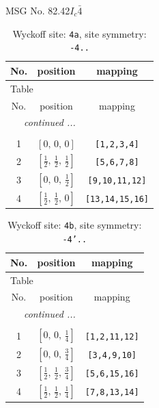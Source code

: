 \documentclass[fleqn,8pt]{jsarticle}
\begin{document}
\setcounter{MaxMatrixCols}{32}

\renewcommand{\tablename}{Table~}
\renewcommand{\figurename}{Figure~}
\begin{center}
\LARGE
MSG No. 82.42\quad$I_{c}\bar{4}$
\end{center}
\renewcommand{\arraystretch}{1.2}
\begin{longtable}{ccc}
\caption{Wyckoff site: {\tt 4a}, site symmetry: {\tt -4..}}
 \\
 \hline \hline
No. & position & mapping \\ \hline \endfirsthead

\multicolumn{2}{l}{\tablename\ \thetable{}} \\
 \hline \hline
No. & position & mapping \\ \hline \endhead

 \hline \hline
\multicolumn{2}{r}{\footnotesize\it continued ...} \\ \endfoot

 \hline \hline
\multicolumn{2}{r}{} \\ \endlastfoot

1 & $\left[ 0,\, 0,\, 0 \right]$ & {\tt [1,2,3,4]} \\ \hline
2 & $\left[ \frac{1}{2},\, \frac{1}{2},\, \frac{1}{2} \right]$ & {\tt [5,6,7,8]} \\ \hline
3 & $\left[ 0,\, 0,\, \frac{1}{2} \right]$ & {\tt [9,10,11,12]} \\ \hline
4 & $\left[ \frac{1}{2},\, \frac{1}{2},\, 0 \right]$ & {\tt [13,14,15,16]} \\
\end{longtable}
\renewcommand{\arraystretch}{1.2}
\begin{longtable}{ccc}
\caption{Wyckoff site: {\tt 4b}, site symmetry: {\tt -4'..}}
 \\
 \hline \hline
No. & position & mapping \\ \hline \endfirsthead

\multicolumn{2}{l}{\tablename\ \thetable{}} \\
 \hline \hline
No. & position & mapping \\ \hline \endhead

 \hline \hline
\multicolumn{2}{r}{\footnotesize\it continued ...} \\ \endfoot

 \hline \hline
\multicolumn{2}{r}{} \\ \endlastfoot

1 & $\left[ 0,\, 0,\, \frac{1}{4} \right]$ & {\tt [1,2,11,12]} \\ \hline
2 & $\left[ 0,\, 0,\, \frac{3}{4} \right]$ & {\tt [3,4,9,10]} \\ \hline
3 & $\left[ \frac{1}{2},\, \frac{1}{2},\, \frac{3}{4} \right]$ & {\tt [5,6,15,16]} \\ \hline
4 & $\left[ \frac{1}{2},\, \frac{1}{2},\, \frac{1}{4} \right]$ & {\tt [7,8,13,14]} \\
\end{longtable}
\end{document}
